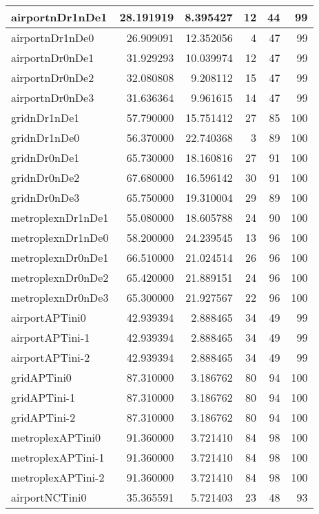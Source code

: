\begin{longtable}{|l|r|r|r|r|r|}
\endlastfoot
airportnDr1nDe1 & 28.191919 & 8.395427 & 12 & 44 & 99 \\ \hline
airportnDr1nDe0 & 26.909091 & 12.352056 & 4 & 47 & 99 \\ \hline
airportnDr0nDe1 & 31.929293 & 10.039974 & 12 & 47 & 99 \\ \hline
airportnDr0nDe2 & 32.080808 & 9.208112 & 15 & 47 & 99 \\ \hline
airportnDr0nDe3 & 31.636364 & 9.961615 & 14 & 47 & 99 \\ \hline
gridnDr1nDe1 & 57.790000 & 15.751412 & 27 & 85 & 100 \\ \hline
gridnDr1nDe0 & 56.370000 & 22.740368 & 3 & 89 & 100 \\ \hline
gridnDr0nDe1 & 65.730000 & 18.160816 & 27 & 91 & 100 \\ \hline
gridnDr0nDe2 & 67.680000 & 16.596142 & 30 & 91 & 100 \\ \hline
gridnDr0nDe3 & 65.750000 & 19.310004 & 29 & 89 & 100 \\ \hline
metroplexnDr1nDe1 & 55.080000 & 18.605788 & 24 & 90 & 100 \\ \hline
metroplexnDr1nDe0 & 58.200000 & 24.239545 & 13 & 96 & 100 \\ \hline
metroplexnDr0nDe1 & 66.510000 & 21.024514 & 26 & 96 & 100 \\ \hline
metroplexnDr0nDe2 & 65.420000 & 21.889151 & 24 & 96 & 100 \\ \hline
metroplexnDr0nDe3 & 65.300000 & 21.927567 & 22 & 96 & 100 \\ \hline
airportAPTini0 & 42.939394 & 2.888465 & 34 & 49 & 99 \\ \hline
airportAPTini-1 & 42.939394 & 2.888465 & 34 & 49 & 99 \\ \hline
airportAPTini-2 & 42.939394 & 2.888465 & 34 & 49 & 99 \\ \hline
gridAPTini0 & 87.310000 & 3.186762 & 80 & 94 & 100 \\ \hline
gridAPTini-1 & 87.310000 & 3.186762 & 80 & 94 & 100 \\ \hline
gridAPTini-2 & 87.310000 & 3.186762 & 80 & 94 & 100 \\ \hline
metroplexAPTini0 & 91.360000 & 3.721410 & 84 & 98 & 100 \\ \hline
metroplexAPTini-1 & 91.360000 & 3.721410 & 84 & 98 & 100 \\ \hline
metroplexAPTini-2 & 91.360000 & 3.721410 & 84 & 98 & 100 \\ \hline
airportNCTini0 & 35.365591 & 5.721403 & 23 & 48 & 93 \\ \hline

\end{longtable}
